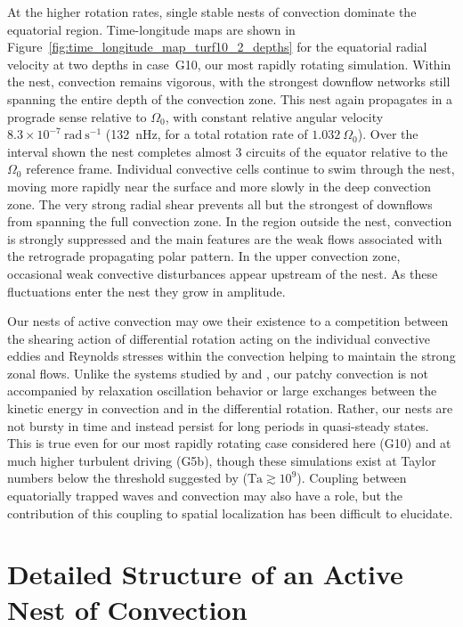 At the higher rotation rates, single stable nests of convection
dominate the equatorial region.  Time-longitude maps are shown in
Figure~\ref{fig:time_longitude_map_turf10_2_depths} for the equatorial
radial velocity at two depths in case~G10, our most rapidly rotating simulation.
Within the nest, convection remains vigorous, with the strongest
downflow networks still spanning the entire depth of the convection
zone.  This nest again propagates in a prograde sense relative to
$\Omega_0$, with constant relative angular velocity $8.3\times
10^{-7}~\mathrm{rad}~\mathrm{s}^{-1}$ (132~nHz, for a total rotation
rate of $1.032~\Omega_0$).  Over the interval shown the nest completes
almost 3 circuits of the equator relative to the $\Omega_0$ reference
frame.  Individual convective cells continue to swim through the nest,
moving more rapidly near the surface and more slowly in the deep
convection zone.  The very strong radial shear prevents all but the
strongest of downflows from spanning the full convection zone.  In the
region outside the nest, convection is strongly suppressed and the
main features are the weak flows associated with the retrograde
propagating polar pattern.  In the upper convection zone, occasional
weak convective disturbances appear upstream of the nest.  As these
fluctuations enter the nest they grow in amplitude.

 
Our nests of active convection may owe their existence to a
competition between the shearing action of differential rotation
acting on the individual convective eddies and Reynolds stresses
within the convection helping to maintain the strong zonal flows.  Unlike
the systems studied by \cite{Grote&Busse_2000} and
\cite{Ballot_et_al_2007}, our patchy convection is not accompanied by
relaxation oscillation behavior or large exchanges between the kinetic
energy in convection and in the differential rotation.  Rather, our
nests are not bursty in time and instead persist for long periods in
quasi-steady states.  This is true even for our most rapidly rotating
case considered here (G10) and at much higher turbulent
driving (G5b), though these simulations exist at Taylor
numbers below the threshold suggested by \cite{Ballot_et_al_2007}
($\mathrm{Ta} \gtrsim 10^9$).  Coupling between equatorially trapped waves and
convection may also have a role, but the contribution
of this coupling to spatial localization has been difficult to elucidate.


\section{Detailed Structure of an Active Nest of Convection}

